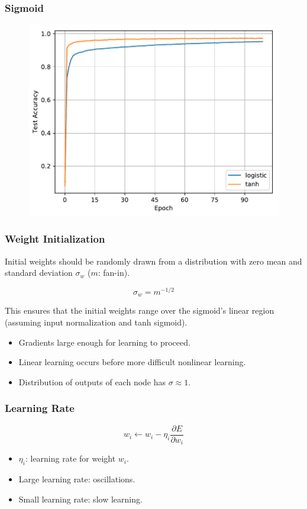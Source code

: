 \documentclass[pdf]{beamer}
\begin{document}
\begin{frame}
\frametitle{Sigmoid}
\begin{figure}[!htb]
  \includegraphics[height=0.8\textheight]{plots/logistic_vs_tanh.pdf}
\end{figure}
\end{frame}

\begin{frame}
\frametitle{Weight Initialization}

Initial weights should be randomly drawn from a distribution with zero mean and standard deviation $\sigma_w$ ($m$: fan-in).

\begin{equation}
  \sigma_w = m^{-1/2}
\end{equation}

This ensures that the initial weights range over the sigmoid's linear region (assuming input normalization and tanh sigmoid).

\begin{itemize}
\item Gradients large enough for learning to proceed.
\item Linear learning occurs before more difficult nonlinear learning.
\item Distribution of outputs of each node has $\sigma \approx 1$.
\end{itemize}
\end{frame}

\begin{frame}
\frametitle{Learning Rate}
\begin{equation}
  w_i \leftarrow w_i - \eta_i \frac{\partial E}{\partial w_i}
\end{equation}
\begin{itemize}
\item $\eta_i$: learning rate for weight $w_i$.
\item Large learning rate: oscillations.
\item Small learning rate: slow learning.
\end{itemize}
\end{frame}
\end{document}
